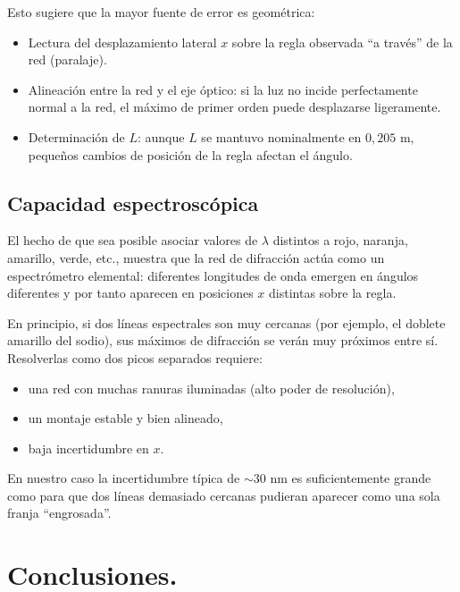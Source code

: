 \documentclass[11pt,twocolumn]{article}
\begin{document}
Esto sugiere que la mayor fuente de error es geométrica:
\begin{itemize}
    \item Lectura del desplazamiento lateral $x$ sobre la regla observada ``a través'' de la red (paralaje).
    \item Alineación entre la red y el eje óptico: si la luz no incide perfectamente normal a la red, el máximo de primer orden puede desplazarse ligeramente.
    \item Determinación de $L$: aunque $L$ se mantuvo nominalmente en $0{,}205$ m, pequeños cambios de posición de la regla afectan el ángulo.
\end{itemize}

\subsection{Capacidad espectroscópica}
El hecho de que sea posible asociar valores de $\lambda$ distintos a rojo, naranja, amarillo, verde, etc., muestra que la red de difracción actúa como un espectrómetro elemental: diferentes longitudes de onda emergen en ángulos diferentes y por tanto aparecen en posiciones $x$ distintas sobre la regla.

En principio, si dos líneas espectrales son muy cercanas (por ejemplo, el doblete amarillo del sodio), sus máximos de difracción se verán muy próximos entre sí. Resolverlas como dos picos separados requiere:
\begin{itemize}
    \item una red con muchas ranuras iluminadas (alto poder de resolución),
    \item un montaje estable y bien alineado,
    \item baja incertidumbre en $x$.
\end{itemize}
En nuestro caso la incertidumbre típica de $\sim30$ nm es suficientemente grande como para que dos líneas demasiado cercanas pudieran aparecer como una sola franja ``engrosada''.


\section{Conclusiones.}
\end{document}
